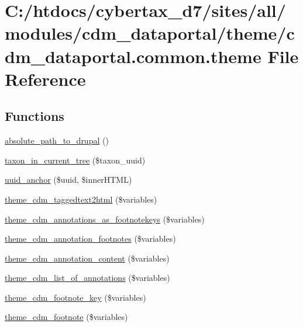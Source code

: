 \hypertarget{cdm__dataportal_8common_8theme}{\section{C\-:/htdocs/cybertax\-\_\-d7/sites/all/modules/cdm\-\_\-dataportal/theme/cdm\-\_\-dataportal.common.\-theme File Reference}
\label{cdm__dataportal_8common_8theme}
}
\subsection*{Functions}
\begin{DoxyCompactItemize}
\item 
\hyperlink{cdm__dataportal_8common_8theme_a3325b6cf5b1f19fdfdfc485a7edb0bf2}{absolute\-\_\-path\-\_\-to\-\_\-drupal} ()
\item 
\hyperlink{cdm__dataportal_8common_8theme_aa57a44943827ba930031005b2395ba6a}{taxon\-\_\-in\-\_\-current\-\_\-tree} (\$taxon\-\_\-uuid)
\item 
\hyperlink{cdm__dataportal_8common_8theme_acb1373f6d76c5cfa75f09aa722f651aa}{uuid\-\_\-anchor} (\$uuid, \$inner\-H\-T\-M\-L)
\item 
\hyperlink{cdm__dataportal_8common_8theme_acfaa2127e081b60a06546aa00a393418}{theme\-\_\-cdm\-\_\-taggedtext2html} (\$variables)
\item 
\hyperlink{cdm__dataportal_8common_8theme_ac1bd9d55e23c428378b63a97bf5aab63}{theme\-\_\-cdm\-\_\-annotations\-\_\-as\-\_\-footnotekeys} (\$variables)
\item 
\hyperlink{cdm__dataportal_8common_8theme_a4766d9e6471d3f8fe26aa5c4c595dec9}{theme\-\_\-cdm\-\_\-annotation\-\_\-footnotes} (\$variables)
\item 
\hyperlink{cdm__dataportal_8common_8theme_a00f4ad9c55f3132e95baf64a4ac474b3}{theme\-\_\-cdm\-\_\-annotation\-\_\-content} (\$variables)
\item 
\hyperlink{cdm__dataportal_8common_8theme_a8f07e361085f91248d2af5fc6058a77a}{theme\-\_\-cdm\-\_\-list\-\_\-of\-\_\-annotations} (\$variables)
\item 
\hyperlink{cdm__dataportal_8common_8theme_a0f06e752baad8268844c453d9065560a}{theme\-\_\-cdm\-\_\-footnote\-\_\-key} (\$variables)
\item 
\hyperlink{cdm__dataportal_8common_8theme_afa16108dcd93be335f53b8f2130deba3}{theme\-\_\-cdm\-\_\-footnote} (\$variables)

\end{DoxyCompactItemize}
